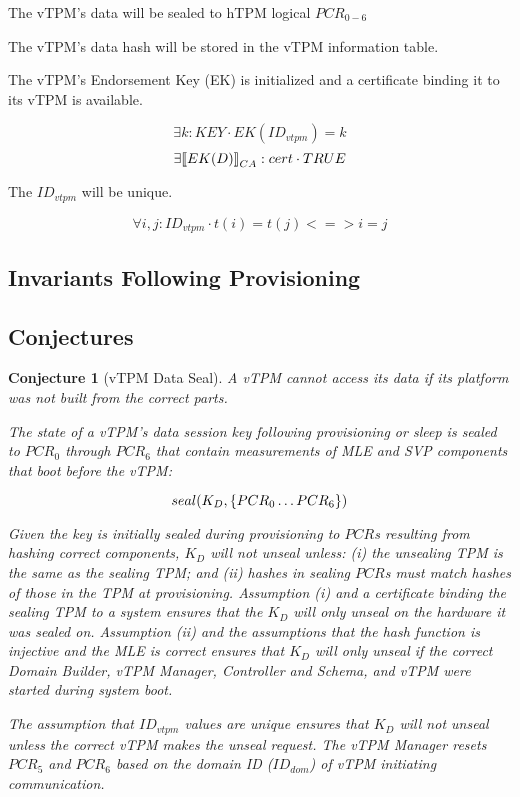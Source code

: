 \documentclass[10pt]{article}
\newtheorem{conjecture}{Conjecture}
\begin{document}
\begin{post}
  The vTPM's data will be sealed to hTPM logical $PCR_{0-6}$
\end{post}

\begin{post}
  The vTPM's data hash will be stored in the vTPM information table.
\end{post}

\begin{post}
  The vTPM's Endorsement Key (EK) is initialized and a certificate
  binding it to its vTPM is available.

  \[\exists k:KEY \cdot EK(ID_{vtpm})=k\] 
  \[\exists |[EK(D)|]_{CA}:cert \cdot TRUE\]
\end{post}

\begin{post}
  The $ID_{vtpm}$ will be unique.

  \[\forall i,j:ID_{vtpm} \cdot t(i)=t(j) <=> i=j\]
\end{post}

\subsection{Invariants Following Provisioning}

\subsection{Conjectures}

\begin{conjecture}[vTPM Data Seal]
  A vTPM cannot access its data if its platform was not built from the
  correct parts.

  The state of a vTPM's data session key following provisioning or
  sleep is sealed to $PCR_0$ through $PCR_6$ that contain measurements
  of MLE and SVP components that boot before the vTPM:

  \[seal(K_D,\{PCR_0\ldots PCR_6\})\]

  Given the key is initially sealed during provisioning to $PCR$s
  resulting from hashing correct components, $K_D$ will not unseal
  unless: (i) the unsealing TPM is the same as the sealing TPM; and
  (ii) hashes in sealing $PCR$s must match hashes of those in the TPM
  at provisioning.  Assumption (i) and a certificate binding the
  sealing TPM to a system ensures that the $K_D$ will only unseal on
  the hardware it was sealed on.  Assumption (ii) and the assumptions
  that the hash function is injective and the MLE is correct ensures
  that $K_D$ will only unseal if the correct Domain Builder, vTPM
  Manager, Controller and Schema, and vTPM were started during system
  boot.

  The assumption that $ID_{vtpm}$ values are unique ensures that $K_D$
  will not unseal unless the correct vTPM makes the unseal request.
  The vTPM Manager resets $PCR_5$ and $PCR_6$ based on the domain ID
  ($ID_{dom}$) of vTPM initiating communication.
\end{conjecture}
\end{document}
